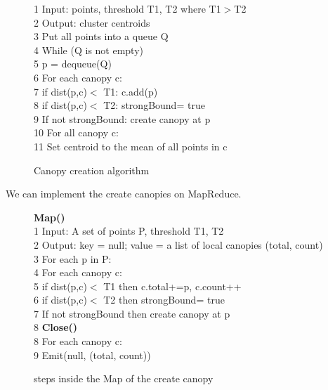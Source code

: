 \begin{figure}[H]
1 \hspace{5ex}Input: points, threshold T1, T2 where T1$>$T2\\
2 \hspace{5ex}Output: cluster centroids\\
3 \hspace{5ex}Put all points into a queue Q\\
4 \hspace{5ex}While (Q is not empty)\\
5 \hspace{10ex}p = dequeue(Q)\\
6 \hspace{10ex}For each canopy c:\\
7 \hspace{15ex}if dist(p,c)$<$ T1: c.add(p)\\
8 \hspace{15ex}if dist(p,c)$<$ T2: strongBound= true\\
9 \hspace{10ex}If not strongBound: create canopy at p\\
10 \hspace{4ex}For all canopy c:\\
11 \hspace{9ex}Set centroid to the mean of all points in c\\
\caption{Canopy creation algorithm \cite{SPYa10}}
\label{alg:createCanopies_singleMachine}
\end{figure} 

We can implement the create canopies on MapReduce. 
\begin{figure}[H]
\hspace{3ex} \textbf{Map()}\\
1 \hspace{5ex}Input: A set of points P, threshold T1, T2\\
2 \hspace{5ex}Output: key = null; value = a list of local canopies (total, count)\\
3 \hspace{5ex}For each p in P:\\
4 \hspace{10ex}For each canopy c:\\
5 \hspace{15ex}if dist(p,c)$<$ T1 then c.total+=p, c.count++\\
6 \hspace{15ex}if dist(p,c)$<$ T2 then strongBound= true\\
7 \hspace{15ex}If not strongBound then create canopy at p\\ 
8 \hspace{3ex}\textbf{Close()}\\
8 \hspace{5ex}For each canopy c:\\
9 \hspace{10ex}Emit(null, (total, count))\\
\caption{steps inside the Map  of the create canopy}
\label{fig:map}
\end{figure} 

